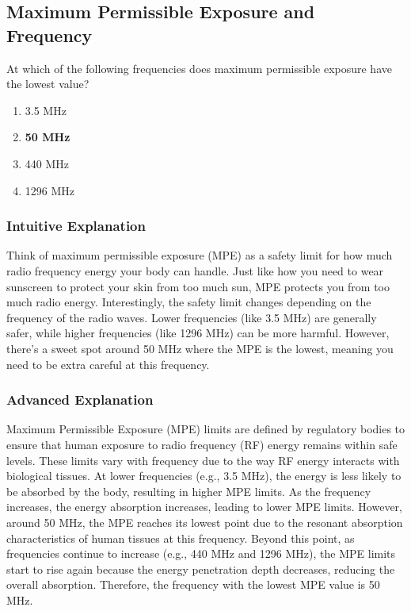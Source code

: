 \subsection{Maximum Permissible Exposure and Frequency}
\label{T0C02}

\begin{tcolorbox}[colback=gray!10!white,colframe=black!75!black,title=T0C02]
At which of the following frequencies does maximum permissible exposure have the lowest value?
\begin{enumerate}[noitemsep]
    \item 3.5 MHz
    \item \textbf{50 MHz}
    \item 440 MHz
    \item 1296 MHz
\end{enumerate}
\end{tcolorbox}

\subsubsection*{Intuitive Explanation}
Think of maximum permissible exposure (MPE) as a safety limit for how much radio frequency energy your body can handle. Just like how you need to wear sunscreen to protect your skin from too much sun, MPE protects you from too much radio energy. Interestingly, the safety limit changes depending on the frequency of the radio waves. Lower frequencies (like 3.5 MHz) are generally safer, while higher frequencies (like 1296 MHz) can be more harmful. However, there's a sweet spot around 50 MHz where the MPE is the lowest, meaning you need to be extra careful at this frequency.

\subsubsection*{Advanced Explanation}
Maximum Permissible Exposure (MPE) limits are defined by regulatory bodies to ensure that human exposure to radio frequency (RF) energy remains within safe levels. These limits vary with frequency due to the way RF energy interacts with biological tissues. At lower frequencies (e.g., 3.5 MHz), the energy is less likely to be absorbed by the body, resulting in higher MPE limits. As the frequency increases, the energy absorption increases, leading to lower MPE limits. However, around 50 MHz, the MPE reaches its lowest point due to the resonant absorption characteristics of human tissues at this frequency. Beyond this point, as frequencies continue to increase (e.g., 440 MHz and 1296 MHz), the MPE limits start to rise again because the energy penetration depth decreases, reducing the overall absorption. Therefore, the frequency with the lowest MPE value is 50 MHz.